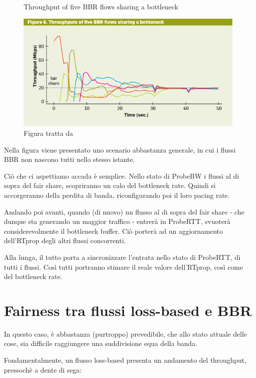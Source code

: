 \begin{figure}[H]

\center
\caption{Throughput of five BBR flows sharing a bottleneck}
\includegraphics[scale=1.1]{chapters/application/img/fairness_bbr}
\caption*{Figura tratta da \cite[p.~64]{Cardwell:2017:BCC:3042068.3009824}}

\end{figure}

Nella figura viene presentato uno scenario abbastanza generale, in cui i flussi BBR non nascono tutti nello stesso istante. \bigskip

Ciò che ci aspettiamo accada è semplice. Nello stato di ProbeBW i flussi al di sopra del fair share, scopriranno un calo del bottleneck rate. Quindi si accorgeranno della perdita di banda, riconfigurando poi il loro pacing rate. \bigskip

Andando poi avanti, quando (di nuovo) un flusso al di sopra del fair share - che dunque sta generando un maggior traffico - entrerà in ProbeRTT, svuoterà considerevolmente il bottleneck buffer. Ciò porterà ad un aggiornamento dell'RTprop degli altri flussi concorrenti. \bigskip

Alla lunga, il tutto porta a sincronizzare l'entrata nello stato di ProbeRTT, di tutti i flussi. Così tutti portranno stimare il reale valore dell'RTprop, così come del bottleneck rate.

\section{Fairness tra flussi loss-based e BBR}

In questo caso, è abbastanza (purtroppo) prevedibile, che allo stato attuale delle cose, sia difficile raggiungere una suddivisione equa della banda. \bigskip

Fondamentalmente, un flusso loss-based presenta un andamento del throughput, pressochè a dente di sega:

